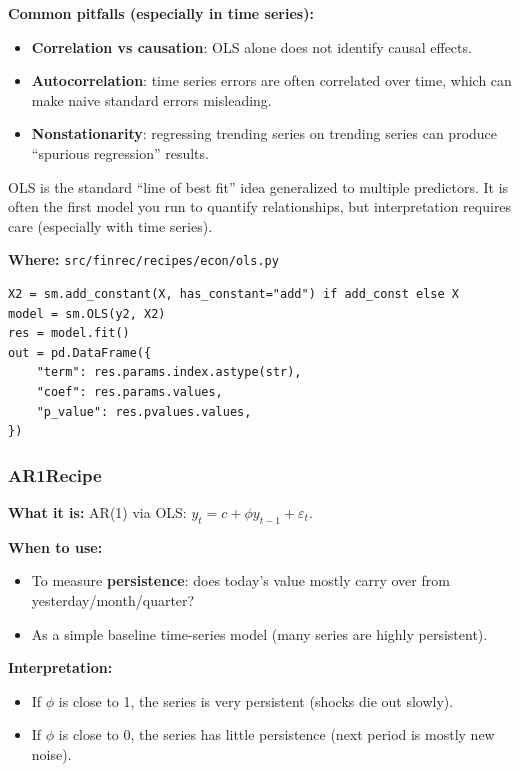\documentclass[11pt,a4paper]{article}
\begin{document}
\textbf{Common pitfalls (especially in time series):}
\begin{itemize}[leftmargin=2em]
  \item \textbf{Correlation vs causation}: OLS alone does not identify causal effects.
  \item \textbf{Autocorrelation}: time series errors are often correlated over time, which can make naive standard errors misleading.
  \item \textbf{Nonstationarity}: regressing trending series on trending series can produce ``spurious regression'' results.
\end{itemize}

\begin{intuitionbox}
OLS is the standard ``line of best fit'' idea generalized to multiple predictors. It is often the first model you run to quantify relationships, but interpretation requires care (especially with time series).
\end{intuitionbox}

\textbf{Where:} \texttt{src/finrec/recipes/econ/ols.py}

\begin{lstlisting}
X2 = sm.add_constant(X, has_constant="add") if add_const else X
model = sm.OLS(y2, X2)
res = model.fit()
out = pd.DataFrame({
    "term": res.params.index.astype(str),
    "coef": res.params.values,
    "p_value": res.pvalues.values,
})
\end{lstlisting}

\subsubsection{AR1Recipe}\label{sec:ar1}

\textbf{What it is:} AR(1) via OLS: $y_t = c + \phi y_{t-1} + \varepsilon_t$.

\textbf{When to use:}
\begin{itemize}[leftmargin=2em]
  \item To measure \textbf{persistence}: does today’s value mostly carry over from yesterday/month/quarter?
  \item As a simple baseline time-series model (many series are highly persistent).
\end{itemize}

\textbf{Interpretation:}
\begin{itemize}[leftmargin=2em]
  \item If \(\phi\) is close to 1, the series is very persistent (shocks die out slowly).
  \item If \(\phi\) is close to 0, the series has little persistence (next period is mostly new noise).
\end{itemize}
\end{document}
